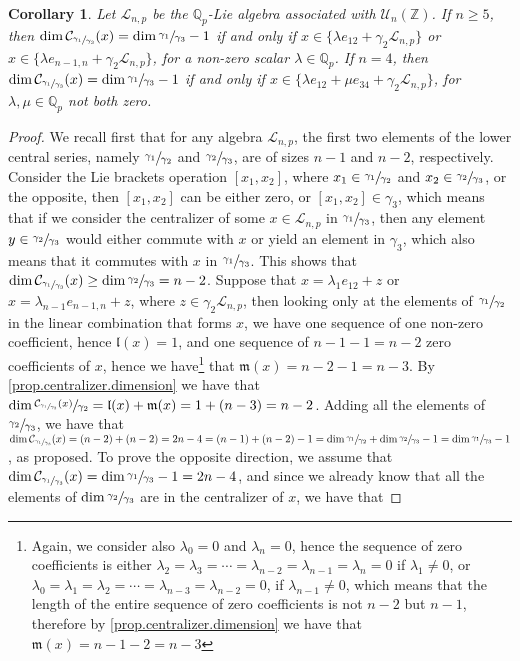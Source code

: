 \documentclass[12pt]{article}
\newtheorem{corollary}[theorem]{Corollary}
\begin{document}
\begin{corollary}
\label{prop.n.geq.4.centralizer.codimension}
Let $\mathcal{L}_{n,p}$ be the $\mathbb{Q}_p$-Lie algebra associated with $\mathcal{U}_n(\mathbb{Z})$. If $n\geq 5$, then $\dim\mathcal{C}_{\sfrac{\gamma_1}{\gamma_3}}(x)=\dim\sfrac{\gamma_1}{\gamma_3}-1$ if and only if $x\in\{\lambda e_{12}+\gamma_2\mathcal{L}_{n,p}\}$ or $x\in\{\lambda e_{n-1,n}+\gamma_2\mathcal{L}_{n,p}\}$, for a non-zero scalar $\lambda\in\mathbb{Q}_p$. If $n=4$, then $\dim\mathcal{C}_{\sfrac{\gamma_1}{\gamma_3}}(x)=\dim\sfrac{\gamma_1}{\gamma_3}-1$ if and only if $x\in\{\lambda e_{12}+\mu e_{34}+\gamma_2\mathcal{L}_{n,p}\}$, for $\lambda,\mu\in\mathbb{Q}_p$ not both zero.
\end{corollary}
\begin{proof}
We recall first that for any algebra $\mathcal{L}_{n,p}$, the first two elements of the lower central series, namely $\sfrac{\gamma_1}{\gamma_2}$ and $\sfrac{\gamma_2}{\gamma_3}$, are of sizes $n-1$ and $n-2$, respectively. Consider the Lie brackets operation $[x_1,x_2]$, where $x_1\in\sfrac{\gamma_1}{\gamma_2}$ and $x_2\in\sfrac{\gamma_2}{\gamma_3}$, or the opposite, then $[x_1,x_2]$ can be either zero, or $[x_1,x_2]\in\gamma_3$, which means that if we consider the centralizer of some $x\in\mathcal{L}_{n,p}$ in $\sfrac{\gamma_1}{\gamma_3}$, then any element $y\in\sfrac{\gamma_2}{\gamma_3}$ would either commute with $x$ or yield an element in $\gamma_3$, which also means that it commutes with $x$ in $\sfrac{\gamma_1}{\gamma_3}$. This shows that $\dim\mathcal{C}_{\sfrac{\gamma_1}{\gamma_3}}(x)\geq\dim\sfrac{\gamma_2}{\gamma_3}=n-2$. Suppose that $x=\lambda_1 e_{12}+z$ or $x=\lambda_{n-1}e_{n-1,n}+z$, where $z\in\gamma_2\mathcal{L}_{n,p}$, then looking only at the elements of $\sfrac{\gamma_1}{\gamma_2}$ in the linear combination that forms $x$, we have one sequence of one non-zero coefficient, hence $\mathfrak{l}(x)=1$, and one sequence of $n-1-1=n-2$ zero coefficients of $x$, hence we have\footnote{Again, we consider also $\lambda_0=0$ and $\lambda_n=0$, hence the sequence of zero coefficients is either $\lambda_2=\lambda_3=\cdots=\lambda_{n-2}=\lambda_{n-1}=\lambda_n=0$ if $\lambda_1\neq 0$, or $\lambda_0=\lambda_1=\lambda_2=\cdots=\lambda_{n-3}=\lambda_{n-2}=0$, if $\lambda_{n-1}\neq 0$, which means that the length of the entire sequence of zero coefficients is not $n-2$ but $n-1$, therefore by \ref{prop.centralizer.dimension} we have that $\mathfrak{m}(x)=n-1-2=n-3$} that $\mathfrak{m}(x)=n-2-1=n-3$. By \ref{prop.centralizer.dimension} we have that $\dim\sfrac{\mathcal{C}_{\sfrac{\gamma_1}{\gamma_3}}(x)}{\gamma_2}=\mathfrak{l}(x)+\mathfrak{m}(x)=1+(n-3)=n-2$. Adding all the elements of $\sfrac{\gamma_2}{\gamma_3}$, we have that $\dim\mathcal{C}_{\sfrac{\gamma_1}{\gamma_3}}(x)=(n-2)+(n-2)=2n-4=(n-1)+(n-2)-1=\dim\sfrac{\gamma_1}{\gamma_2}+\dim\sfrac{\gamma_2}{\gamma_3}-1=\dim\sfrac{\gamma_1}{\gamma_3}-1$, as proposed. To prove the opposite direction, we assume that $\dim\mathcal{C}_{\sfrac{\gamma_1}{\gamma_3}}(x)=\dim\sfrac{\gamma_1}{\gamma_3}-1=2n-4$, and since we already know that all the elements of $\dim\sfrac{\gamma_2}{\gamma_3}$ are in the centralizer of $x$, we have that 
\end{proof}
\end{document}
